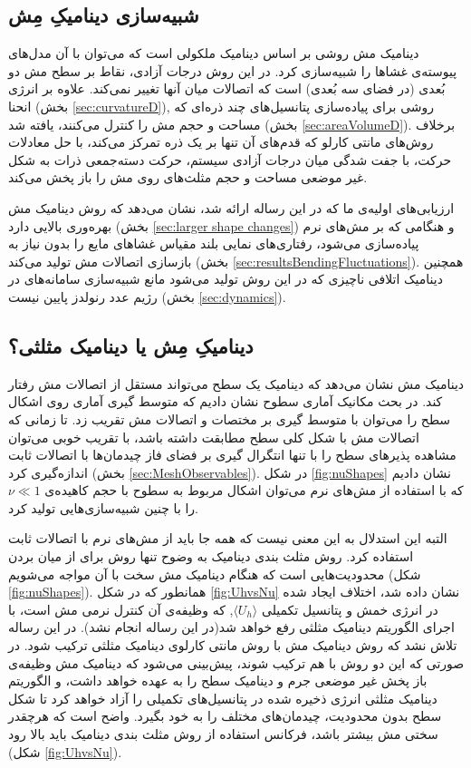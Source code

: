 \subsection{
شبیه‌سازی دینامیکِ مِش
}
دینامیک مش روشی بر اساس دینامیک ملکولی است که می‌توان با آن مدل‌های پیوسته‌ی غشا‌ها را شبیه‌سازی کرد. در این روش درجات آزادی، نقاط بر سطح مش دو بُعدی (در فضای سه بُعدی) است که اتصالات میان آنها تغییر نمی‌کند. علاوه بر انرژی انحنا (بخش
\ref{sec:curvatureD}),
روشی برای پیاده‌سازی پتانسیل‌های چند ذره‌ای که مساحت و حجم مش را کنترل می‌کنند، یافته شد (بخش
 \ref{sec:areaVolumeD}).
  برخلاف روش‌های مانتی کارلو که قدم‌های آن تنها بر یک ذره تمرکز می‌کند، با حل معادلات حرکت، با جفت شدگی میان درجات آزادی سیستم، حرکت دسته‌جمعی ذرات به شکل غیر موضعی مساحت‌ و حجم‌ مثلث‌های روی مش را باز پخش می‌کند.

ارزیابی‌های اولیه‌ی ما که در این رساله ارائه شد، نشان می‌دهد که روش دینامیک مش بهره‌وری بالایی دارد (بخش
\ref{sec:larger shape changes})
 و هنگامی که بر مش‌های نرم پیاده‌سازی می‌شود، رفتاری‌های نمایی بلند مقیاس غشا‌های مایع را بدون نیاز به بازسازی اتصالات مش تولید می‌کند (بخش
\ref{sec:resultsBendingFluctuations}).
همچنین دینامیک اتلافی ناچیزی که در این روش تولید می‌شود مانع شبیه‌سازی سامانه‌های در رژیم عدد رنولدز پایین نیست (بخش
\ref{sec:dynamics}).

\subsection{
دینامیکِ مِش یا دینامیک مثلثی؟
}
دینامیک مش نشان می‌دهد که دینامیک یک سطح می‌تواند مستقل از اتصالات مش رفتار کند. در بحث مکانیک آماری سطوح نشان دادیم که متوسط گیری آماری روی اشکال سطح را می‌توان با متوسط گیری بر مختصات و اتصالات مش تقریب زد. تا زمانی که اتصالات مش با شکل کلی سطح مطابقت داشته باشد، با تقریب خوبی می‌توان مشاهده پذیر‌های سطح را با تنها انتگرال ‌گیری بر فضای فاز چیدمان‌ها با اتصالات ثابت اندازه‌گیری کرد  (بخش
\ref{sec:MeshObservables}).
 در شکل
\ref{fig:nuShapes}
نشان دادیم که با استفاده از مش‌های نرم می‌توان اشکال مربوط به سطوح با حجم کاهیده‌ی
$\nu\ll1$
را با چنین شبیه‌سازی‌هایی تولید کرد.

التبه این استدلال به این معنی نیست که همه جا باید از مش‌های نرم با اتصالات ثابت استفاده کرد. روش مثلث بندی دینامیک
\cite{BoalPRA1992, Gompper1992Science}
به وضوح تنها روش برای از میان بردن محدودیت‌هایی است که هنگام دینامیک مش سخت با آن مواجه می‌شویم (شکل
\ref{fig:nuShapes}).
 همانطور که در شکل
\ref{fig:UhvsNu}
نشان داده شد، اختلاف ایجاد شده در انرژی خمش و پتانسیل تکمیلی
 $\langle U_h\rangle$,
که وظیفه‌ی آن کنترل نرمی مش است، با اجرای الگوریتم  دینامیک مثلثی رفع خواهد شد(در این رساله انجام نشد). در این رساله تلاش نشد که روش دینامیک مش با روش مانتی کارلوی  دینامیک مثلثی ترکیب شود. در صورتی که این دو روش با هم ترکیب شوند، پیش‌بینی می‌شود که  دینامیک مش وظیفه‌ی باز پخش غیر موضعی جرم و دینامیک سطح را به عهده خواهد داشت، و الگوریتم  دینامیک مثلثی انرژی ذخیره شده در پتانسیل‌های تکمیلی را آزاد خواهد کرد تا شکل سطح بدون محدودیت، چیدمان‌های مختلف را به خود بگیرد. واضح است که هرچقدر سختی مش بیشتر باشد، فرکانس استفاده از روش مثلث بندی دینامیک  باید بالا رود (شکل
\ref{fig:UhvsNu}).



